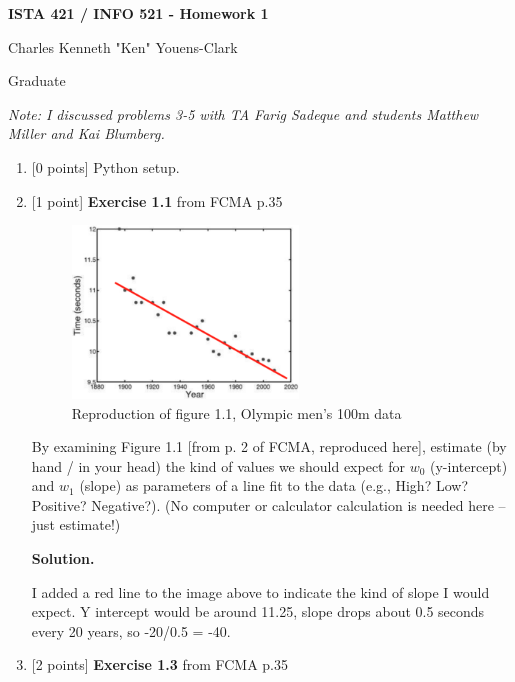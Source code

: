 \documentclass[10pt]{article}
\begin{document}
\begin{center}
    {\Large {\bf ISTA 421 / INFO 521 - Homework 1}} \\
\end{center}

\begin{flushright}
Charles Kenneth "Ken" Youens-Clark

Graduate 
\end{flushright}

\vspace{1cm}

\emph{Note: I discussed problems 3-5 with TA Farig Sadeque and students Matthew Miller and Kai Blumberg.}

\begin{enumerate}

\item \label{prob:1} [0 points]
Python setup.

\item \label{prob:2} [1 point]
{\bf Exercise 1.1} from FCMA p.35

\begin{figure}[htb]
\begin{center}
\includegraphics[width=6cm]{figures/figure1-1_p2}
\caption{Reproduction of figure 1.1, Olympic men's 100m data}
\end{center}
\end{figure}
By examining Figure 1.1 [from p. 2 of FCMA, reproduced here], estimate (by hand / in your head) the kind of values we should expect for $w_0$ (y-intercept) and $w_1$ (slope) as parameters of a line fit to the data (e.g., High? Low?  Positive?  Negative?).  (No computer or calculator calculation is needed here -- just estimate!)

{\bf Solution.} 

I added a red line to the image above to indicate the kind of slope I would expect. Y intercept would be around 11.25, slope drops about 0.5 seconds every 20 years, so -20/0.5 = -40.


\item \label{prob:3} [2 points]
{\bf Exercise 1.3} from FCMA p.35


\end{enumerate}
\end{document}
